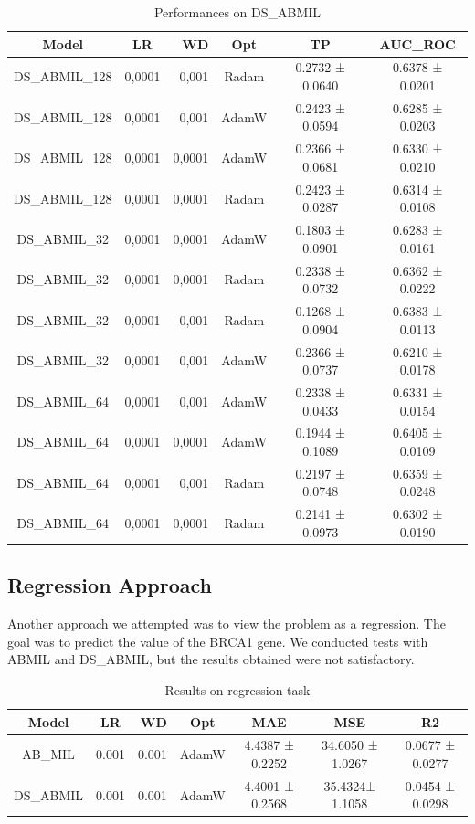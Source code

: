 \documentclass{article}
\begin{document}
\begin{table}[h]
\begin{tabular}{|ccrc|c|c|}
		\hline
		Model & LR & WD & Opt & TP & AUC\_ROC \\
		\hline
		DS\_ABMIL\_128 & 0,0001 & 0,001 & Radam & 0.2732 ± 0.0640 & 0.6378 ± 0.0201 \\
		DS\_ABMIL\_128 & 0,0001 & 0,001 & AdamW & 0.2423 ± 0.0594 & 0.6285 ± 0.0203 \\
		DS\_ABMIL\_128 & 0,0001 & 0,0001 & AdamW & 0.2366 ± 0.0681 & 0.6330 ± 0.0210 \\
		DS\_ABMIL\_128 & 0,0001 & 0,0001 & Radam & 0.2423 ± 0.0287 & 0.6314 ± 0.0108 \\
		DS\_ABMIL\_32 & 0,0001 & 0,0001 & AdamW & 0.1803 ± 0.0901 & 0.6283 ± 0.0161 \\
		DS\_ABMIL\_32 & 0,0001 & 0,0001 & Radam & 0.2338 ± 0.0732 & 0.6362 ± 0.0222 \\
		DS\_ABMIL\_32 & 0,0001 & 0,001 & Radam & 0.1268 ± 0.0904 & 0.6383 ± 0.0113 \\
		DS\_ABMIL\_32 & 0,0001 & 0,001 & AdamW & 0.2366 ± 0.0737 & 0.6210 ± 0.0178 \\
		DS\_ABMIL\_64 & 0,0001 & 0,001 & AdamW & 0.2338 ± 0.0433 & 0.6331 ± 0.0154 \\
		DS\_ABMIL\_64 & 0,0001 & 0,0001 & AdamW & 0.1944 ± 0.1089 & 0.6405 ± 0.0109\\
		DS\_ABMIL\_64 & 0,0001 & 0,001 & Radam & 0.2197 ± 0.0748 & 0.6359 ± 0.0248\\
		DS\_ABMIL\_64 & 0,0001 & 0,0001 & Radam	& 0.2141 ± 0.0973 & 0.6302 ± 0.0190\\
		\hline
	\end{tabular}

	\caption{Performances on DS\_ABMIL}
\end{table}
\clearpage
\subsection{Regression Approach}
Another approach we attempted was to view the problem as a regression. The goal was to predict the value of the BRCA1 gene. We conducted tests with ABMIL and DS\_ABMIL, but the results obtained were not satisfactory.

\begin{table}[h]
	\centering
	\begin{tabular}{|ccrc|c|c|c|}
		\hline
		Model & LR & WD & Opt & MAE & MSE & R2 \\ 
		\hline
		AB\_MIL & 0.001 & 0.001 & AdamW & 4.4387 ± 0.2252 & 34.6050 ± 1.0267 & 0.0677 ± 0.0277 \\
		DS\_ABMIL & 0.001 & 0.001 & AdamW & 4.4001 ± 0.2568 & 35.4324± 1.1058 & 0.0454 ± 0.0298 \\ 
		\hline
	\end{tabular}
 \caption{Results on regression task}
\end{table}
\end{document}

